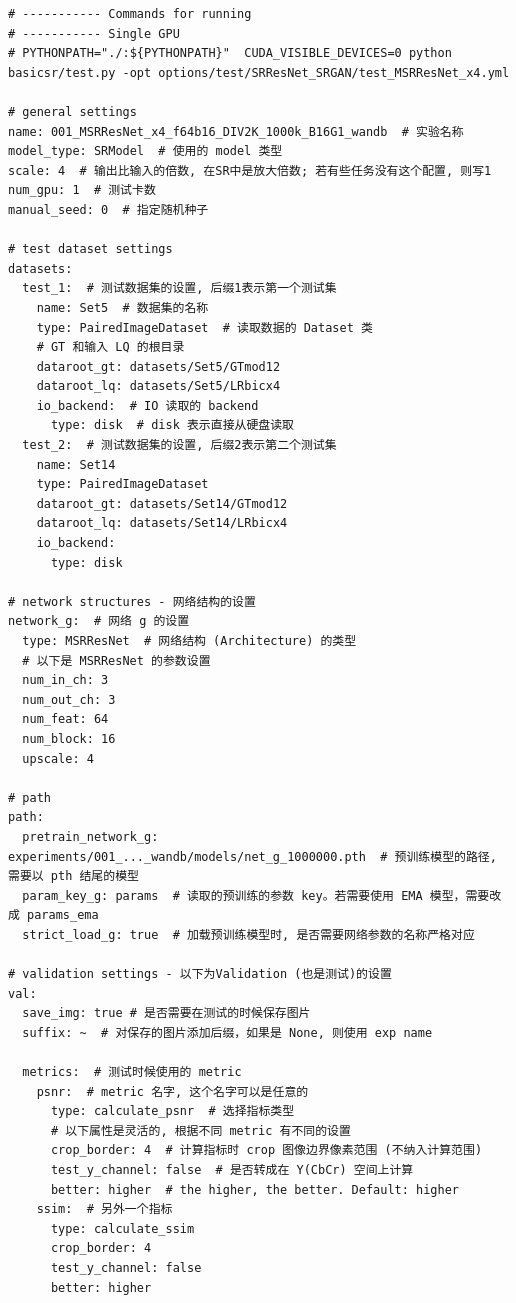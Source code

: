 \documentclass[../main.tex]{subfiles}
\begin{document}
\begin{verbatim}
# ----------- Commands for running
# ----------- Single GPU
# PYTHONPATH="./:${PYTHONPATH}"  CUDA_VISIBLE_DEVICES=0 python basicsr/test.py -opt options/test/SRResNet_SRGAN/test_MSRResNet_x4.yml

# general settings
name: 001_MSRResNet_x4_f64b16_DIV2K_1000k_B16G1_wandb  # 实验名称
model_type: SRModel  # 使用的 model 类型
scale: 4  # 输出比输入的倍数, 在SR中是放大倍数; 若有些任务没有这个配置, 则写1
num_gpu: 1  # 测试卡数
manual_seed: 0  # 指定随机种子

# test dataset settings
datasets:
  test_1:  # 测试数据集的设置, 后缀1表示第一个测试集
    name: Set5  # 数据集的名称
    type: PairedImageDataset  # 读取数据的 Dataset 类
    # GT 和输入 LQ 的根目录
    dataroot_gt: datasets/Set5/GTmod12
    dataroot_lq: datasets/Set5/LRbicx4
    io_backend:  # IO 读取的 backend
      type: disk  # disk 表示直接从硬盘读取
  test_2:  # 测试数据集的设置, 后缀2表示第二个测试集
    name: Set14
    type: PairedImageDataset
    dataroot_gt: datasets/Set14/GTmod12
    dataroot_lq: datasets/Set14/LRbicx4
    io_backend:
      type: disk

# network structures - 网络结构的设置
network_g:  # 网络 g 的设置
  type: MSRResNet  # 网络结构 (Architecture) 的类型
  # 以下是 MSRResNet 的参数设置
  num_in_ch: 3
  num_out_ch: 3
  num_feat: 64
  num_block: 16
  upscale: 4

# path
path:
  pretrain_network_g: experiments/001_..._wandb/models/net_g_1000000.pth  # 预训练模型的路径, 需要以 pth 结尾的模型
  param_key_g: params  # 读取的预训练的参数 key。若需要使用 EMA 模型，需要改成 params_ema
  strict_load_g: true  # 加载预训练模型时, 是否需要网络参数的名称严格对应

# validation settings - 以下为Validation (也是测试)的设置
val:
  save_img: true # 是否需要在测试的时候保存图片
  suffix: ~  # 对保存的图片添加后缀，如果是 None, 则使用 exp name

  metrics:  # 测试时候使用的 metric
    psnr:  # metric 名字, 这个名字可以是任意的
      type: calculate_psnr  # 选择指标类型
      # 以下属性是灵活的, 根据不同 metric 有不同的设置
      crop_border: 4  # 计算指标时 crop 图像边界像素范围 (不纳入计算范围)
      test_y_channel: false  # 是否转成在 Y(CbCr) 空间上计算
      better: higher  # the higher, the better. Default: higher
    ssim:  # 另外一个指标
      type: calculate_ssim
      crop_border: 4
      test_y_channel: false
      better: higher
\end{verbatim}
\end{document}
